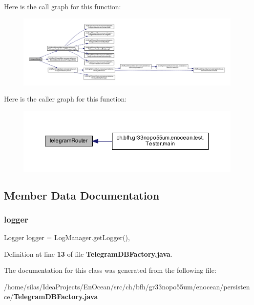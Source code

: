 Here is the call graph for this function\+:\nopagebreak
\begin{figure}[H]
\begin{center}
\leavevmode
\includegraphics[width=350pt]{d5/d60/classch_1_1bfh_1_1gr33nopo55um_1_1enocean_1_1persistence_1_1TelegramDBFactory_aa3e18eb7573a67ca3d664e5fc2ae1529_cgraph}
\end{center}
\end{figure}
Here is the caller graph for this function\+:\nopagebreak
\begin{figure}[H]
\begin{center}
\leavevmode
\includegraphics[width=350pt]{d5/d60/classch_1_1bfh_1_1gr33nopo55um_1_1enocean_1_1persistence_1_1TelegramDBFactory_aa3e18eb7573a67ca3d664e5fc2ae1529_icgraph}
\end{center}
\end{figure}


\subsection{Member Data Documentation}
\label{classch_1_1bfh_1_1gr33nopo55um_1_1enocean_1_1persistence_1_1TelegramDBFactory_a5b27630dbcf231bfda3a7d79e1eefce5} 
\subsubsection{logger}
{\footnotesize\ttfamily Logger logger = Log\+Manager.\+get\+Logger()\hspace{0.3cm}{\ttfamily [static]}, {\ttfamily [private]}}



Definition at line {\bf 13} of file {\bf Telegram\+D\+B\+Factory.\+java}.



The documentation for this class was generated from the following file\+:\begin{DoxyCompactItemize}
\item 
/home/silas/\+Idea\+Projects/\+En\+Ocean/src/ch/bfh/gr33nopo55um/enocean/persistence/{\bf Telegram\+D\+B\+Factory.\+java}\end{DoxyCompactItemize}
